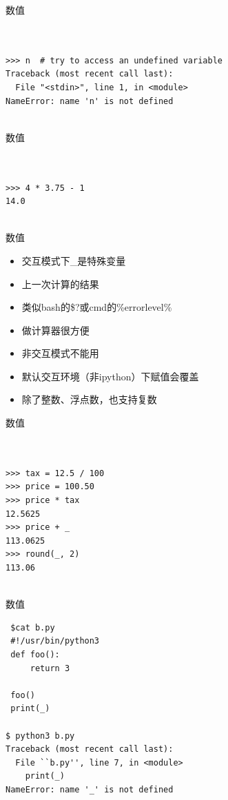 \documentclass{beamer}
\begin{document}
\begin{frame}[t,fragile]{数值}


\begin{verbatim}


>>> n  # try to access an undefined variable
Traceback (most recent call last):
  File "<stdin>", line 1, in <module>
NameError: name 'n' is not defined


\end{verbatim}


\end{frame}




\begin{frame}[t,fragile]{数值}


\begin{verbatim}


>>> 4 * 3.75 - 1
14.0


\end{verbatim}


\end{frame}


\begin{frame}[t]{数值}

\begin{itemize}
    \item 交互模式下\_是特殊变量
    \item 上一次计算的结果
    \item 类似bash的\$?或cmd的\%errorlevel\%
    \item 做计算器很方便
    \item 非交互模式不能用
    \item 默认交互环境（非ipython）下赋值会覆盖
    \item 除了整数、浮点数，也支持复数
\end{itemize}

\end{frame}


\begin{frame}[t,fragile]{数值}


\begin{verbatim}


>>> tax = 12.5 / 100
>>> price = 100.50
>>> price * tax
12.5625
>>> price + _
113.0625
>>> round(_, 2)
113.06


\end{verbatim}


\end{frame}


\begin{frame}[t,fragile]{数值}


\begin{verbatim}
 $cat b.py
 #!/usr/bin/python3
 def foo():
     return 3
     
 foo()
 print(_)
     
$ python3 b.py
Traceback (most recent call last):
  File ``b.py'', line 7, in <module>
    print(_)
NameError: name '_' is not defined

\end{verbatim}


\end{frame}
\end{document}
